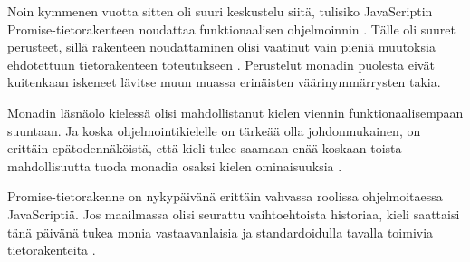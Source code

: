Noin kymmenen vuotta sitten oli suuri keskustelu siitä, tulisiko JavaScriptin Promise-tietorakenteen noudattaa funktionaalisen ohjelmoinnin . Tälle oli suuret perusteet, sillä rakenteen noudattaminen olisi vaatinut vain pieniä muutoksia ehdotettuun tietorakenteen toteutukseen \cite{promises-spec-94}. Perustelut monadin puolesta eivät kuitenkaan iskeneet lävitse muun muassa erinäisten väärinymmärrysten takia.

Monadin läsnäolo kielessä olisi mahdollistanut kielen viennin funktionaalisempaan suuntaan. Ja koska ohjelmointikielelle on tärkeää olla johdonmukainen, on erittäin epätodennäköistä, että kieli tulee saamaan enää koskaan toista mahdollisuutta tuoda monadia osaksi kielen ominaisuuksia \cite{proposal-joint-iteration,prototype_library_trends}.

Promise-tietorakenne on nykypäivänä erittäin vahvassa roolissa ohjelmoitaessa JavaScriptiä. Jos maailmassa olisi seurattu vaihtoehtoista historiaa, kieli saattaisi tänä päivänä tukea monia vastaavanlaisia ja standardoidulla tavalla toimivia tietorakenteita \cite{promises-spec-94}.







